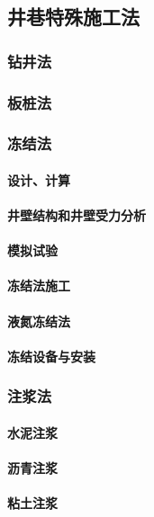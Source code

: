 \documentclass[UTF8]{../../ApplicationUniverse}
\begin{document}
    \subsection{井巷特殊施工法}
        \subsubsection{钻井法}
        \subsubsection{板桩法}
        \subsubsection{冻结法}
            \paragraph{设计、计算}
            \paragraph{井壁结构和井壁受力分析}
            \paragraph{模拟试验}
            \paragraph{冻结法施工}
            \paragraph{液氮冻结法}
            \paragraph{冻结设备与安装}
        \subsubsection{注浆法}
            \paragraph{水泥注浆}
            \paragraph{沥青注浆}
            \paragraph{粘土注浆}
\end{document}
